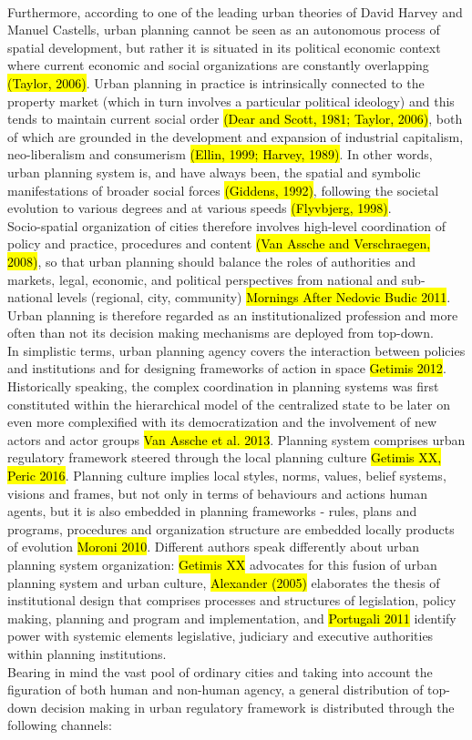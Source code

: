 \documentclass[11pt]{report}
\begin{document}
\\ 
Furthermore, according to one of the leading urban theories of David Harvey and Manuel Castells, urban planning cannot be seen as an autonomous process of spatial development, but rather it is situated in its political economic context where current economic and social organizations are constantly overlapping \hl{(Taylor, 2006)}.
Urban planning in practice is intrinsically connected to the property market (which in turn involves a particular political ideology) and this tends to maintain current social order \hl{(Dear and Scott, 1981; Taylor, 2006)}, both of which are grounded in the development and expansion of industrial capitalism, neo-liberalism and consumerism \hl{(Ellin, 1999; Harvey, 1989)}. In other words, urban planning system is, and have always been, the spatial and symbolic manifestations of broader social forces \hl{(Giddens, 1992)}, following the societal evolution to various degrees and at various speeds \hl{(Flyvbjerg, 1998)}.
\\
Socio-spatial organization of cities therefore involves high-level coordination of policy and practice, procedures and content \hl{(Van Assche and Verschraegen, 2008)}, so that urban planning should balance the roles of authorities and markets, legal, economic, and political perspectives from national and sub-national levels (regional, city, community) \hl{Mornings After Nedovic Budic 2011}.
Urban planning is therefore regarded as an institutionalized profession and more often than not its decision making mechanisms are deployed from top-down.
\\
In simplistic terms, urban planning agency covers the interaction between policies and institutions and for designing frameworks of action in space \hl{Getimis 2012}.
Historically speaking, the complex coordination in planning systems was first constituted within the hierarchical model of the centralized state to be later on even more complexified with its democratization and the involvement of new actors and actor groups
\hl{Van Assche et al. 2013}.
Planning system comprises urban regulatory framework steered through the local planning culture \hl{Getimis XX, Peric 2016}.
Planning culture implies local styles, norms, values, belief systems, visions and frames, but not only in terms of behaviours and actions human agents, but it is also embedded in planning frameworks - rules, plans and programs, procedures and organization structure are embedded locally products of evolution \hl{Moroni 2010}.
Different authors speak differently about urban planning system organization: \hl{Getimis XX} advocates for this fusion of urban planning system and urban culture, \hl{Alexander (2005)} elaborates the thesis of institutional design that comprises processes and structures of legislation, policy making, planning and program and implementation, and \hl{Portugali 2011} identify power with systemic elements legislative, judiciary and executive authorities within planning institutions.
\\
Bearing in mind the vast pool of ordinary cities and taking into account the figuration of both human and non-human agency, a general distribution of top-down decision making in urban regulatory framework is distributed through the following channels:
\end{document}
